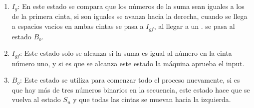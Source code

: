 \documentclass[12pt]{article}
\begin{document}
\begin{enumerate}
		        \item \textit{$I_{g}$}: En este estado se compara que los números de la suma sean iguales a los de la primera cinta, si son iguales se avanza hacia la derecha, cuando se llega a espacios vacios en ambas cintas se pasa a \textit{$I_{gf}$}, al llegar a un . se pasa al estado \textit{$B_{o}$}.
		        \item \textit{$I_{gf}$}: Este estado solo se alcanza si la suma es igual al número en la cinta número uno, y si es que se alcanza este estado la máquina aprueba el input.
		        \item \textit{$B_{o}$}: Este estado se utiliza para comenzar todo el proceso nuevamente, si es que hay más de tres números binarios en la secuencia, este estado hace que se vuelva al estado \textit{$S_{u}$} y que todas las cintas se muevan hacia la izquierda.
		    \end{enumerate}
\end{document}
